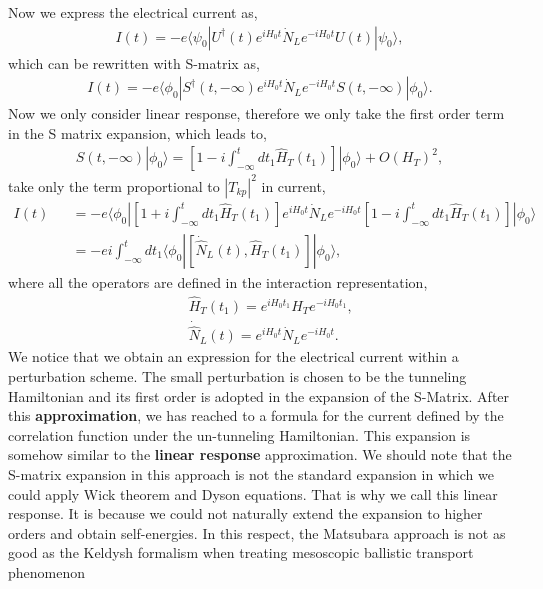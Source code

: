 \documentclass[11pt]{article}
\begin{document}
    Now we express the electrical current as, \begin{eqnarray}
I(t) =-e \langle  \psi_0|U^{\dagger}(t)e^{iH_0t}\dot
N_Le^{-iH_0t}U(t)|\psi_0 \rangle,
\end{eqnarray} which can be rewritten with S-matrix as, \begin{eqnarray}
I(t) =-e \langle  \phi_0|S^{\dagger}(t,-\infty)e^{iH_0t}\dot
N_Le^{-iH_0t}S(t,-\infty)|\phi_0 \rangle.
\end{eqnarray} Now we only consider linear response, therefore we only
take the first order term in the S matrix expansion, which leads to,
\begin{eqnarray}
S(t,-\infty)|\phi_0 \rangle =\left[1-i\int_{-\infty}^t dt_1 \hat H_T(t_1)\right]|\phi_0 \rangle + O(H_T)^2,
\end{eqnarray} take only the term proportional to \(|T_{kp}|^2\) in
current, \begin{eqnarray}
I(t)&&=  -e \langle  \phi_0|\left[1+ i\int_{-\infty}^t dt_1 \hat H_T(t_1)\right]e^{iH_0t}\dot
N_Le^{-iH_0t}\left[1-i\int_{-\infty}^t dt_1 \hat H_T(t_1)\right]|\phi_0 \rangle
\nonumber\\
&&=-ei\int_{-\infty}^t dt_1 \langle  \phi_0|\left[\dot {\hat N}_L(t),\hat H_T(t_1)\right]|\phi_0 \rangle,
\end{eqnarray} where all the operators are defined in the interaction
representation, \begin{eqnarray}
&&\hat H_T(t_1)=e^{iH_0t_1}H_Te^{-iH_0t_1},
\nonumber\\
&&\dot {\hat N}_L(t)=e^{iH_0t}{\dot N}_Le^{-iH_0t}.
\end{eqnarray} We notice that we obtain an expression for the electrical
current within a perturbation scheme. The small perturbation is chosen
to be the tunneling Hamiltonian and its first order is adopted in the
expansion of the S-Matrix. After this \textbf{approximation}, we has
reached to a formula for the current defined by the correlation function
under the un-tunneling Hamiltonian. This expansion is somehow similar to
the \textbf{linear response} approximation. We should note that the
S-matrix expansion in this approach is not the standard expansion in
which we could apply Wick theorem and Dyson equations. That is why we
call this linear response. It is because we could not naturally extend
the expansion to higher orders and obtain self-energies. In this
respect, the Matsubara approach is not as good as the Keldysh formalism
when treating mesoscopic ballistic transport phenomenon
\end{document}
